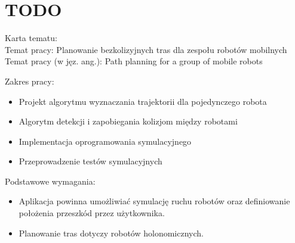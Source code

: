 \chapter{TODO}
\label{ch:todo}

Karta tematu: \\
Temat pracy: Planowanie bezkolizyjnych tras dla zespołu robotów mobilnych \\
Temat pracy (w jęz. ang.): Path planning for a group of mobile robots

Zakres pracy:
\begin{itemize}
	\item Projekt algorytmu wyznaczania trajektorii dla pojedynczego robota
	\item Algorytm detekcji i zapobiegania kolizjom między robotami
	\item Implementacja oprogramowania symulacyjnego
	\item Przeprowadzenie testów symulacyjnych
\end{itemize}

Podstawowe wymagania:
\begin{itemize}
	\item Aplikacja powinna umożliwiać symulację ruchu robotów oraz definiowanie położenia przeszkód przez użytkownika.
	\item Planowanie tras dotyczy robotów holonomicznych.
\end{itemize}


